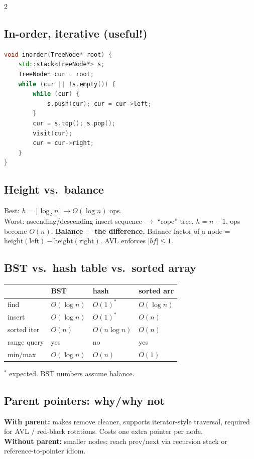 \documentclass[10pt]{article}
\begin{document}
\begin{multicols}{2}
\subsection*{In-order, iterative (useful!)}
\begin{lstlisting}[language=C++]
void inorder(TreeNode* root) {
    std::stack<TreeNode*> s;
    TreeNode* cur = root;
    while (cur || !s.empty()) {
        while (cur) {
            s.push(cur); cur = cur->left;
        }
        cur = s.top(); s.pop();
        visit(cur);
        cur = cur->right;
    }
}
\end{lstlisting}

\subsection*{Height vs.\ balance}
Best: $h = \lfloor \log_2 n \rfloor \to O(\log n)$ ops.\\
Worst: ascending/descending insert sequence $\to$ ``rope'' tree,
$h = n - 1$, ops become $O(n)$.
\textbf{Balance = the difference.}
Balance factor of a node = $\text{height}(\text{left}) -
\text{height}(\text{right})$. AVL enforces $|bf| \leq 1$.

\subsection*{BST vs.\ hash table vs.\ sorted array}
\begin{tabular}{@{}l|lll@{}}
                  & \textbf{BST} & \textbf{hash} & \textbf{sorted arr}\\
\hline
find              & $O(\log n)$  & $O(1)^*$      & $O(\log n)$\\
insert            & $O(\log n)$  & $O(1)^*$      & $O(n)$\\
sorted iter       & $O(n)$       & $O(n \log n)$ & $O(n)$\\
range query       & yes          & no            & yes\\
min/max           & $O(\log n)$  & $O(n)$        & $O(1)$
\end{tabular}
$^*$ expected. BST numbers assume balance.

\subsection*{Parent pointers: why/why not}
\textbf{With parent:} makes remove cleaner, supports iterator-style
traversal, required for AVL / red-black rotations. Costs one extra
pointer per node.\\
\textbf{Without parent:} smaller nodes; reach prev/next via recursion
stack or reference-to-pointer idiom.


\end{multicols}
\end{document}
